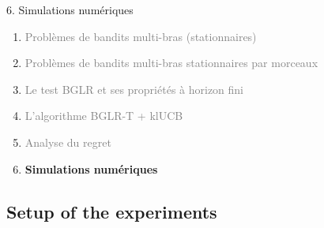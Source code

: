 \documentclass[11pt,french,ignorenonframetext,]{beamer}
\begin{document}
\begin{frame}{6. Simulations numériques}

  \begin{enumerate}
    \item
    \textcolor{gray}{
      Problèmes de bandits multi-bras (stationnaires)
    }
    \vspace*{15pt}

    \item
    \textcolor{gray}{
      Problèmes de bandits multi-bras stationnaires par morceaux
    }
    \vspace*{15pt}

    \item
    \textcolor{gray}{
      Le test BGLR et ses propriétés à horizon fini
    }
    \vspace*{15pt}

    \item
    \textcolor{gray}{
      L'algorithme BGLR-T + klUCB
    }
    \vspace*{15pt}

    \item
    \textcolor{gray}{
      Analyse du regret
    }
    \vspace*{15pt}

    \item
    \alert{\textbf{%
      Simulations numériques
    }}
  \end{enumerate}

\end{frame}


\subsection{\hfill{}Setup of the experiments\hfill{}}
\end{document}
